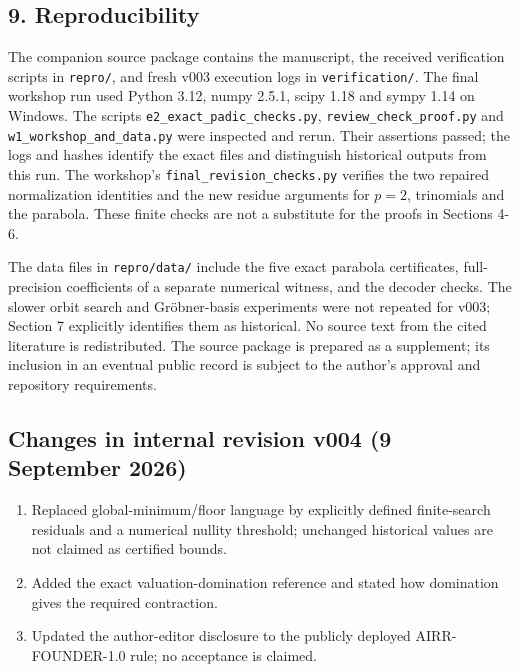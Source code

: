 \documentclass[
  11pt,
  a4paper,
]{article}
\providecommand{\tightlist}{%
  \setlength{\itemsep}{0pt}\setlength{\parskip}{0pt}}
\begin{document}
\subsection{9. Reproducibility}\label{reproducibility}

The companion source package contains the manuscript, the received
verification scripts in {\small\texttt{repro/\allowbreak{}}}, and fresh v003 execution logs
in {\small\texttt{verification/\allowbreak{}}}. The final workshop run used Python 3.12,
numpy 2.5.1, scipy 1.18 and sympy 1.14 on Windows. The scripts
{\small\texttt{e2\_\allowbreak{}exact\_\allowbreak{}padic\_\allowbreak{}checks.\allowbreak{}py}}, {\small\texttt{review\_\allowbreak{}check\_\allowbreak{}proof.\allowbreak{}py}}
and {\small\texttt{w1\_\allowbreak{}workshop\_\allowbreak{}and\_\allowbreak{}data.\allowbreak{}py}} were inspected and rerun. Their
assertions passed; the logs and hashes identify the exact files and
distinguish historical outputs from this run. The workshop's
{\small\texttt{final\_\allowbreak{}revision\_\allowbreak{}checks.\allowbreak{}py}} verifies the two repaired
normalization identities and the new residue arguments for \(p=2\),
trinomials and the parabola. These finite checks are not a substitute
for the proofs in Sections 4-6.

The data files in {\small\texttt{repro/\allowbreak{}data/\allowbreak{}}} include the five exact parabola
certificates, full-precision coefficients of a separate numerical
witness, and the decoder checks. The slower orbit search and
Gröbner-basis experiments were not repeated for v003; Section 7
explicitly identifies them as historical. No source text from the cited
literature is redistributed. The source package is prepared as a
supplement; its inclusion in an eventual public record is subject to the
author's approval and repository requirements.

\subsection{Changes in internal revision v004 (9 September
2026)}\label{changes-in-internal-revision-v004-9-september-2026}

\begin{enumerate}
\def\labelenumi{\arabic{enumi}.}
\tightlist
\item
  Replaced global-minimum/floor language by explicitly defined
  finite-search residuals and a numerical nullity threshold; unchanged
  historical values are not claimed as certified bounds.
\item
  Added the exact valuation-domination reference and stated how
  domination gives the required contraction.
\item
  Updated the author-editor disclosure to the publicly deployed
  AIRR-FOUNDER-1.0 rule; no acceptance is claimed.
\end{enumerate}
\end{document}
